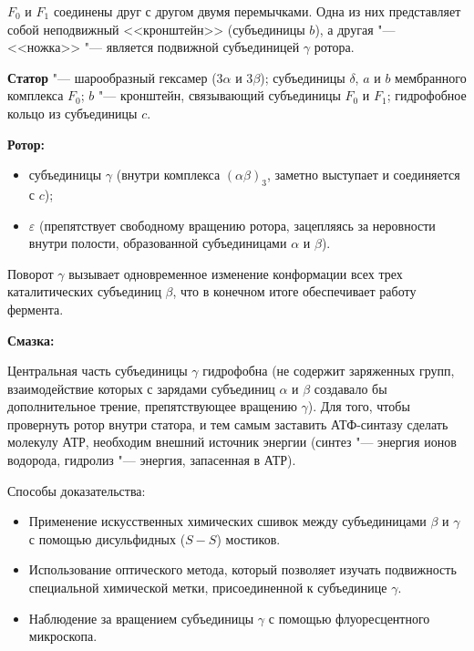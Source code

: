 \documentclass[12pt,a4paper,oneside]{book}
\begin{document}
$F_0$ и $F_1$ соединены друг с другом двумя перемычками. Одна из них представляет собой неподвижный <<кронштейн>> (субъединицы $b$), а другая "--- <<ножка>> "--- является подвижной субъединицей $\gamma$ ротора.

\par{}

{\bf Статор} "--- шарообразный гексамер (3$\alpha$ и 3$\beta$); субъединицы $\delta$, $a$ и $b$ мембранного комплекса $F_0$; $b$ "--- кронштейн, связывающий субъединицы $F_0$ и $F_1$; гидрофобное кольцо из субъединицы $c$. 

{\bf Ротор:}

\begin{itemize}
 \item[-] субъединицы $\gamma$ (внутри комплекса $(\alpha \beta)_3$, заметно выступает и соединяется с $c$);
 \item[-] $\varepsilon$ (препятствует свободному вращению ротора, зацепляясь за неровности внутри полости, образованной субъединицами $\alpha$ и $\beta$). 
\end{itemize}
 
Поворот $\gamma$ вызывает одновременное изменение конформации всех трех каталитических субъединиц $\beta$, что в конечном итоге обеспечивает работу фермента. 

{\bf Смазка:}

Центральная часть субъединицы $\gamma$ гидрофобна (не содержит заряженных групп, взаимодействие которых с зарядами субъединиц $\alpha$ и $\beta$ создавало бы дополнительное трение, препятствующее вращению $\gamma$). 
Для того, чтобы провернуть ротор внутри статора, и тем самым заставить АТФ-синтазу сделать молекулу АТР, необходим внешний источник энергии (синтез "--- энергия ионов водорода, гидролиз "--- энергия, запасенная в АТР). 

\par{}

Способы доказательства:

\begin{itemize}
\item[1.] Применение искусственных химических сшивок между субъединицами $\beta$ и $\gamma$ с помощью дисульфидных ($S-S$) мостиков. 
\item[2.] Использование оптического метода, который позволяет изучать подвижность специальной химической метки, присоединенной к субъединице $\gamma$. 
\item[3.] Наблюдение за вращением субъединицы $\gamma$ с помощью флуоресцентного микроскопа. 
\end{itemize}
\end{document}
